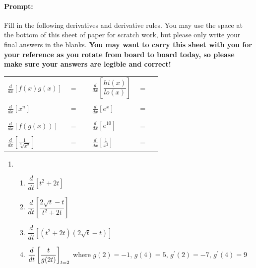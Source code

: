 \documentclass[10pt]{article}
\begin{document}
\pagestyle{otherpages}
\thispagestyle{firstpage}

{
\paragraph*{Prompt:} Fill in the following derivatives and derivative rules. You may use the space at the bottom of this sheet of paper for scratch work, but please only write your final answers in the blanks. {\bf You may want to carry this sheet with you for your reference as you rotate from board to board today, so please make sure your answers are legible and correct!}\\[0.1in]

\begin{tabular}{l c r l c r}
            $\displaystyle\frac{d}{dx}\left[ f(x)g(x) \right]$ & $=$ & \rule[-8pt]{2in}{0.4pt} &
            $\displaystyle\frac{d}{dx}\left[ \dfrac{hi(x)}{lo(x)} \right]$ & $=$ & \rule[-8pt]{2in}{0.4pt}\\[0.3in]
            $\displaystyle\frac{d}{dx}\left[ x^n \right]$ & $=$ & \rule[-8pt]{2in}{0.4pt} & 
            $\displaystyle\frac{d}{dx}\left[ e^x \right]$ & $=$ & \rule[-8pt]{2in}{0.4pt}\\[0.3in]
            $\displaystyle\frac{d}{dx}\left[ f(g(x)) \right]$ & $=$ & \rule[-8pt]{2in}{0.4pt} & 
            $\displaystyle\frac{d}{dx}\left[ e^{10} \right]$ & $=$ & \rule[-8pt]{2in}{0.4pt}\\[0.3in]
            $\displaystyle\frac{d}{dx}\left[ \frac{1}{\sqrt[3]{x^2}} \right]$ & $=$ & \rule[-8pt]{2in}{0.4pt} & 
            $\displaystyle\frac{d}{dx}\left[ \frac{1}{x^2} \right]$ & $=$ & \rule[-8pt]{2in}{0.4pt}\\[0.3in]
        \end{tabular}

\newpage%

{\large
\begin{enumerate}

\item[Board 1.] \, 
    \begin{enumerate}
    \item $\dfrac{d}{dt}[ t^2 + 2t]$
    \item $\dfrac{d}{dt}\left[\dfrac{2\sqrt{t}-t}{t^2+2t}\right]$
    \item $\dfrac{d}{dt}\left[(t^2+2t)(2\sqrt{t}-t)\right]$
      \item $\displaystyle \dfrac{d}{dt}\left[\frac{t}{g(2t)}\right]_{t=2}$  where $g(2)=-1$, $g(4)=5$, $g^{\prime}(2)= -7$, $g^{\prime}(4)= 9$ 
    \end{enumerate}
\newpage 


\end{enumerate}}}
\end{document}
